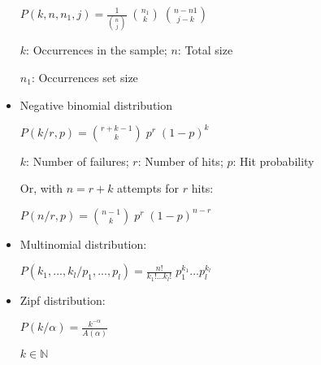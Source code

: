 \documentclass{article}
\begin{document}
\begin{itemize}
$P(k,n,n_{1},j) = \frac{1}{\binom{n}{j}} \; \binom{n_{1}}{k} \; \binom{n - n{1}}{j - k}$

$k$: Occurrences in the sample; $n$: Total size

$n_{1}$: Occurrences set size

\item Negative binomial distribution

$P(k/r,p) = \binom{r + k - 1}{k} \; p^{r} \; (1 - p)^{k}$

$k$: Number of failures; $r$: Number of hits; $p$: Hit probability

Or, with $n = r + k$ attempts for $r$ hits:

$P(n/r,p) = \binom{n - 1}{k} \; p^{r} \; (1 - p)^{n - r}$

\item Multinomial distribution:

$P(k_{1},...,k_{l}/p_{1},...,p_{l}) = \frac{n!}{k_{1}!...k_{l}!} \; p_{1}^{k_{1}}...p_{l}^{k_{l}}$

\item Zipf distribution:

$P(k/\alpha) = \frac{k^{-\alpha}}{A(\alpha)}$

$k \in \mathbb{N}$

\end{itemize}
\end{document}
